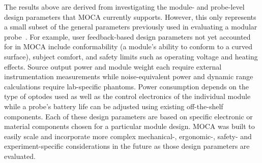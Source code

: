 The results above are derived from investigating the module- and probe-level design parameters that MOCA currently supports. However, this only represents a small subset of the general parameters previously used in evaluating a modular probe~\cite{Zhao2017}. For example, user feedback-based design parameters not yet accounted for in MOCA include conformability (a module's ability to conform to a curved surface), subject comfort, and safety limits such as operating voltage and heating effects. Source output power and module weight each require external instrumentation measurements while noise-equivalent power and dynamic range calculations require lab-specific phantoms. Power consumption depends on the type of optodes used as well as the control electronics of the individual module while a probe's battery life can be adjusted using existing off-the-shelf components. Each of these design parameters are based on specific electronic or material components chosen for a particular module design. MOCA was built to easily scale and incorporate more complex mechanical-, ergonomic-, safety- and experiment-specific considerations in the future as those design parameters are evaluated.

